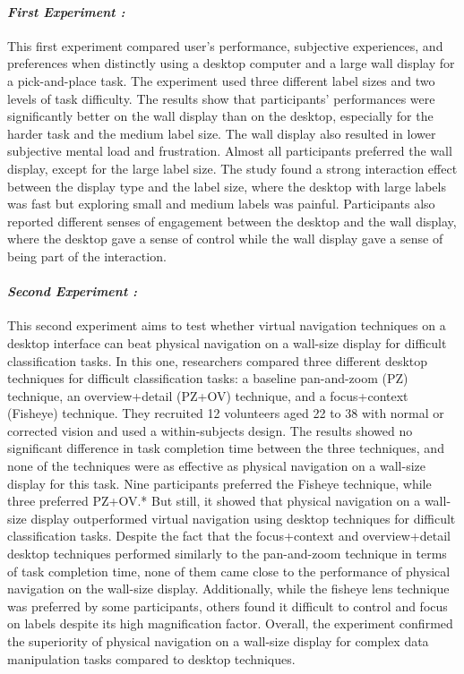\begin{multicols}{2}
        \paragraph{ \textit{First Experiment :} 
                \newline }
        \indent \indent This first experiment compared user's performance, subjective experiences, and preferences when distinctly using a desktop computer and a large wall display for a pick-and-place task. The experiment used three different label sizes 
        and two levels of task difficulty. The results show that participants' performances were significantly better on the wall display than on the desktop, especially for the harder task and the medium label size. The wall display also resulted in lower 
        subjective mental load and frustration. Almost all participants preferred the wall display, except for the large label size. The study found a strong interaction effect between the display type and the label size, where the desktop with large labels 
        was fast but exploring small and medium labels was painful. Participants also reported different senses of engagement between the desktop and the wall display, where the desktop gave a sense of control while the wall display gave a sense of being part 
        of the interaction.

        \paragraph{ \textit{Second Experiment :} 
                \newline }
        \indent \indent This second experiment aims to test whether virtual navigation techniques on a desktop interface can beat physical navigation on a wall-size display for difficult classification tasks. In this one, researchers compared three different desktop 
        techniques for difficult classification tasks: a baseline pan-and-zoom (PZ) technique, an overview+detail (PZ+OV) technique, and a focus+context (Fisheye) technique. They recruited 12 volunteers aged 22 to 38 with normal or corrected vision and used a within-subjects design. 
        The results showed no significant difference in task completion time between the three techniques, and none of the techniques were as effective as physical navigation on a wall-size display for this task. Nine participants preferred the Fisheye technique, while three preferred PZ+OV.*
        But still, it  showed that physical navigation on a wall-size display outperformed virtual navigation using desktop techniques for difficult classification tasks. Despite the fact that the focus+context and overview+detail desktop techniques performed similarly to the pan-and-zoom 
        technique in terms of task completion time, none of them came close to the performance of physical navigation on the wall-size display. Additionally, while the fisheye lens technique was preferred by some participants, others found it difficult to control and focus on labels despite its 
        high magnification factor. Overall, the experiment confirmed the superiority of physical navigation on a wall-size display for complex data manipulation tasks compared to desktop techniques.


\end{multicols}
